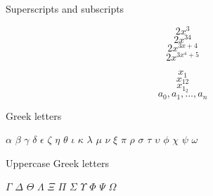 \documentclass{article}
\begin{document}
Superscripts and subscripts

$$2x^3$$
$$2x^{34}$$
$$2x^{3x+4}$$
$$2x^{3x^4+5}$$

$$x_1$$
$$x_{12}$$
$$x_{1_2}$$
$$a_0, a_1, \ldots, a_n$$

Greek letters

$\alpha$
$\beta$
$\gamma$
$\delta$
$\epsilon$
$\zeta$
$\eta$
$\theta$
$\iota$
$\kappa$
$\lambda$
$\mu$
$\nu$
$\xi$
$\pi$
$\rho$
$\sigma$
$\tau$
$\upsilon$
$\phi$
$\chi$
$\psi$
$\omega$

Uppercase Greek letters

$\Gamma$
$\Delta$
$\Theta$
$\Lambda$
$\Xi$
$\Pi$
$\Sigma$
$\Upsilon$
$\Phi$
$\Psi$
$\Omega$
\end{document}
